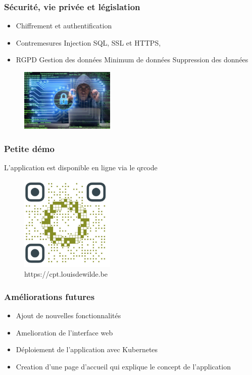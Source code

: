 \documentclass[aspectratio=169]{beamer}
\begin{document}
    \begin{frame}
        \frametitle{Sécurité, vie privée et législation}
        \begin{itemize}
            \item Chiffrement et authentification
            \item Contremesures
            \subitem Injection SQL,
            \subitem SSL et HTTPS,
            \item RGPD
            \subitem Gestion des données
            \subitem Minimum de données
            \subitem Suppression des données
        \end{itemize}
        \begin{figure}[h]
            \centering
            \includegraphics[width=0.4\textwidth]{imgs/young-hacker-cyber-securty-concept-260nw-1450697288}\label{fig:figure5}
        \end{figure}

    \end{frame}

    \begin{frame}
        \frametitle{Petite démo}
        L'application est disponible en ligne via le qrcode
        \begin{figure}[h]
            \centering
            \includegraphics[width=0.4\textwidth]{imgs/QRcode_C2 (5)}\caption{https://cpt.louisdewilde.be}\label{fig:figure2}
        \end{figure}
    \end{frame}

    \begin{frame}
        \frametitle{Améliorations futures}
        \begin{itemize}
            \item Ajout de nouvelles fonctionnalités
            \item Amelioration de l'interface web
            \item Déploiement de l'application avec Kubernetes
            \item Creation d'une page d'accueil qui explique le concept de l'application
        \end{itemize}
    \end{frame}
\end{document}
